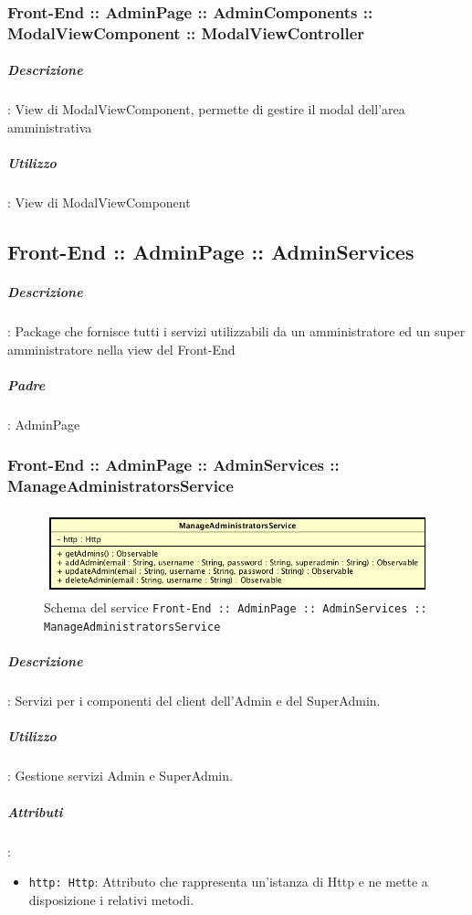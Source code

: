 \documentclass[../ManualeSviluppatore_v1.0.0.tex]{subfiles}
\begin{document}
				\subsubsection{Front-End :: AdminPage :: AdminComponents :: ModalViewComponent :: ModalViewController}
					\subparagraph{Descrizione}: View di ModalViewComponent, permette di gestire il modal dell'area amministrativa
					\subparagraph{Utilizzo}: View di ModalViewComponent


	\newpage
	\subsection{Front-End :: AdminPage :: AdminServices}

			\subparagraph{Descrizione}: Package che fornisce tutti i servizi utilizzabili da un amministratore ed un super amministratore nella view del Front-End
			\subparagraph{Padre}: AdminPage

				\subsubsection{Front-End :: AdminPage :: AdminServices :: ManageAdministratorsService}
				\begin{figure}[!h]
					\centering
					\includegraphics[scale=0.6]{Architettura/Front-End/AdminPage/AdminServices/ManageAdministratorsService.png}
					\caption{Schema del service \texttt{Front-End :: AdminPage :: AdminServices :: ManageAdministratorsService}}
				\end{figure}

					\subparagraph{Descrizione}: Servizi per i componenti del client dell'Admin e del SuperAdmin.
					\subparagraph{Utilizzo}: Gestione servizi Admin e SuperAdmin.
					\subparagraph{Attributi}:
					\begin{itemize}
						\item \texttt{http: Http}: Attributo che rappresenta un'istanza di Http e ne mette a disposizione i relativi metodi.
					\end{itemize}
\newpage
\end{document}
